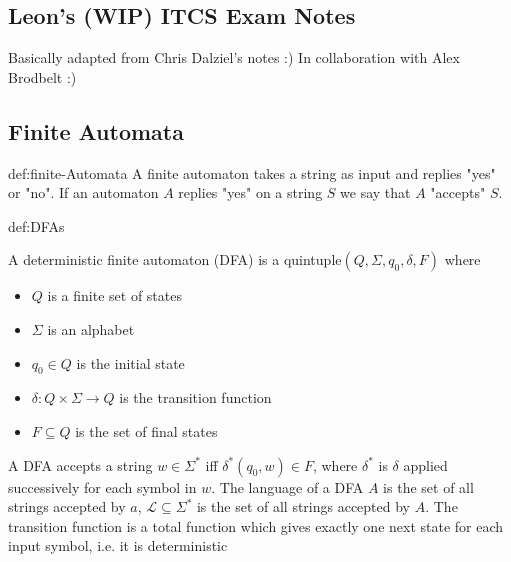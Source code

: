 \documentclass[landscape, 8pt]{extarticle}
\begin{document}
\setlength{\abovedisplayskip}{3.5pt}
\setlength{\belowdisplayskip}{3.5pt}
\setlength{\abovedisplayshortskip}{3.5pt}
\setlength{\belowdisplayshortskip}{3.5pt}

\begin{multicols}{3}
\raggedcolumns %
\section{\huge Leon's (WIP) ITCS Exam Notes}
\vspace{-5pt}
Basically adapted from Chris Dalziel's notes :)\newline
In collaboration with Alex Brodbelt :)
\subsection*{Finite Automata}

\begin{dfn}{def:finite-Automata}{}
A finite automaton takes a string as input and replies "yes" or "no". If an automaton $A$ replies "yes" on a string $S$ we say that $A$ "accepts" $S$.
\end{dfn}

\begin{dfn}{def:DFAs}{}

    A deterministic finite automaton (DFA) is a quintuple\newline $(Q,\Sigma, q_{0}, \delta, F)$ where
    \renewcommand\labelitemi{\tiny$\bullet$}
    \begin{itemize}
        \setlength\itemsep{0em}
        \item $Q$ is a finite set of states
        \item $\Sigma$ is an alphabet
        \item $q_{0}\in Q$ is the initial state
        \item $\delta:Q \times \Sigma \to Q$ is the transition function
        \item $F \subseteq Q$ is the set of final states
    \end{itemize}
    A DFA accepts a string $w\in \Sigma^{*}$ iff $\delta^{*}(q_{0}, w)\in F$, where $\delta^{*}$ is $\delta$ applied successively for each symbol in $w$.
    \newline
    The language of a DFA $A$ is the set of all strings accepted by $a$, $\mathcal{L}\subseteq \Sigma^{*}$ is the set of all strings accepted by $A$.
    \newline
    The transition function is a total function which gives exactly one next state for each input symbol, i.e. it is deterministic
\end{dfn}



\end{multicols}
\end{document}
